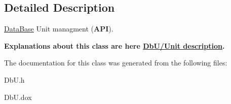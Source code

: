 \subsection{Detailed Description}
\hyperlink{classHurricane_1_1DataBase}{Data\-Base} Unit managment ({\bfseries A\-P\-I}). 

{\bfseries Explanations about this class are here \hyperlink{group__DbUGroup}{Db\-U/\-Unit description}.} 

The documentation for this class was generated from the following files\-:\begin{DoxyCompactItemize}
\item 
Db\-U.\-h\item 
Db\-U.\-dox\end{DoxyCompactItemize}
